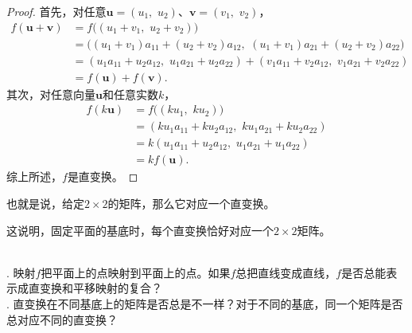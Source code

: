 \documentclass[12pt,UTF8,fontset=none]{ctexbook}
\begin{document}
\begin{proof}
    首先，对任意$\mathbf{u} = (u_1,\,\, u_2)$、$\mathbf{v} = (v_1,\,\,v_2)$，
    \begin{align*}
        f (\mathbf{u} + \mathbf{v}) &= f \big((u_1 + v_1,\,\, u_2 + v_2)\big)  \\
        &= \Big((u_1 + v_1)a_{11} + (u_2 + v_2)a_{12},\,\,(u_1 + v_1)a_{21} + (u_2 + v_2)a_{22}\Big) \\
        &= (u_1a_{11} + u_2a_{12},\,\,u_1a_{21} + u_2a_{22}) + (v_1a_{11} + v_2a_{12},\,\,v_1a_{21} + v_2a_{22}) \\
        &= f (\mathbf{u}) + f (\mathbf{v}). 
    \end{align*}
    其次，对任意向量$\mathbf{u}$和任意实数$k$，
    \begin{align*}
        f (k\mathbf{u}) &= f \big((ku_1,\,\, ku_2)\big)  \\
        &= (ku_1a_{11} + ku_2a_{12},\,\,ku_1a_{21} + ku_2a_{22}) \\
        &= k(u_1a_{11} + u_2a_{12},\,\,u_1a_{21} + u_1a_{22}) \\
        &= kf (\mathbf{u}). 
    \end{align*}  
    综上所述，$f$是直变换。
\end{proof}

也就是说，给定$2\times 2$的矩阵，那么它对应一个直变换。

这说明，固定平面的基底时，每个直变换恰好对应一个$2\times 2$矩阵。

\begin{sk}
    \mbox{} \\
    . 映射$f$把平面上的点映射到平面上的点。如果$f$总把直线变成直线，$f$是否总能表示成直变换和平移映射的复合？\\
    . 直变换在不同基底上的矩阵是否总是不一样？对于不同的基底，同一个矩阵是否总对应不同的直变换？
\end{sk}
\end{document}
